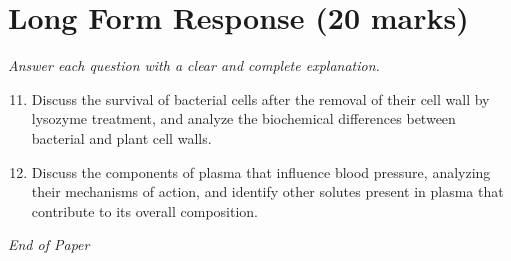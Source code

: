 \documentclass[12pt]{article}
\begin{document}
\section*{Long Form Response (20 marks)}
\textit{Answer each question with a clear and complete explanation.}
\begin{enumerate}[label=\arabic*.]
\setcounter{enumi}{10}
\item Discuss the survival of bacterial cells after the removal of their cell wall by lysozyme treatment, and analyze the biochemical differences between bacterial and plant cell walls.
\item Discuss the components of plasma that influence blood pressure, analyzing their mechanisms of action, and identify other solutes present in plasma that contribute to its overall composition.
\end{enumerate}

\vfill
\noindent\textit{End of Paper}
\end{document}
